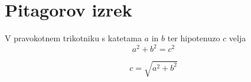 \documentclass{article}
\begin{document}
\section*{Pitagorov izrek}
V pravokotnem trikotniku s katetama \(a\) in \(b\) ter hipotenuzo \(c\) velja
\[ a^2 + b^2 = c^2 \]

\[
    c = \sqrt{a^2 + b^2}
\]
\end{document}
